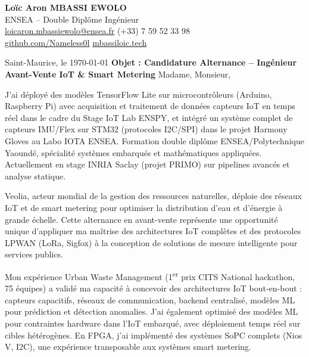 \documentclass[a4paper,11pt]{article}
\begin{document}
\noindent \textbf{Lo\"ic Aron MBASSI EWOLO} \\
ENSEA -- Double Dipl\^ome Ing\'enieur \\
\href{mailto:loicaron.mbassiewolo@ensea.fr}{loicaron.mbassiewolo@ensea.fr} \quad (+33) 7 59 52 33 98 \\
\href{https://github.com/Nameless0l}{github.com/Nameless0l} \quad \href{https://mbassiloic.tech}{mbassiloic.tech}

\vspace{1em}\noindent Saint-Maurice, le \today
\vspace{1em}\noindent \textbf{Objet : Candidature Alternance -- Ing\'enieur Avant-Vente IoT \& Smart Metering}
\vspace{1.5em}\noindent Madame, Monsieur,

\vspace{0.8em}\noindent J'ai d\'eploy\'e des mod\`eles TensorFlow Lite sur microcontr\^oleurs (Arduino, Raspberry Pi) avec acquisition et traitement de donn\'ees capteurs IoT en temps r\'eel dans le cadre du Stage IoT Lab ENSPY, et int\'egr\'e un syst\`eme complet de capteurs IMU/Flex sur STM32 (protocoles I2C/SPI) dans le projet Harmony Gloves au Labo IOTA ENSEA. Formation double dipl\^ome ENSEA/Polytechnique Yaound\'e, sp\'ecialit\'e syst\`emes embarqu\'es et math\'ematiques appliqu\'ees. Actuellement en stage INRIA Saclay (projet PRIMO) sur pipelines avanc\'es et analyse statique.

\vspace{0.8em}\noindent Veolia, acteur mondial de la gestion des ressources naturelles, d\'eploie des r\'eseaux IoT et de smart metering pour optimiser la distribution d'eau et d'\'energie \`a grande \'echelle. Cette alternance en avant-vente repr\'esente une opportunit\'e unique d'appliquer ma maîtrise des architectures IoT compl\`etes et des protocoles LPWAN (LoRa, Sigfox) \`a la conception de solutions de mesure intelligente pour services publics.

\vspace{0.8em}\noindent Mon exp\'erience Urban Waste Management (1\textsuperscript{er} prix CITS National hackathon, 75 \'equipes) a valid\'e ma capacit\'e \`a concevoir des architectures IoT bout-en-bout : capteurs capacitifs, r\'eseaux de communication, backend centralis\'e, mod\`eles ML pour pr\'ediction et d\'etection anomalies. J'ai \'egalement optimis\'e des mod\`eles ML pour contraintes hardware dans l'IoT embarqu\'e, avec d\'eploiement temps r\'eel sur cibles h\'et\'erog\`enes. En FPGA, j'ai impl\'ement\'e des syst\`emes SoPC complets (Nios V, I2C), une exp\'erience transposable aux syst\`emes smart metering.
\end{document}
